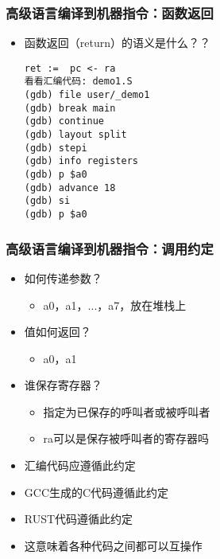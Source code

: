 \begin{frame}[fragile]
	\frametitle{高级语言编译到机器指令：\small{函数返回}}
	
	\begin{itemize}
		
		\item 函数返回（return）的语义是什么？？	
		
		
\begin{block}{}
\begin{verbatim}
ret :=  pc <- ra
看看汇编代码: demo1.S
(gdb) file user/_demo1
(gdb) break main
(gdb) continue
(gdb) layout split
(gdb) stepi
(gdb) info registers
(gdb) p $a0
(gdb) advance 18
(gdb) si
(gdb) p $a0
\end{verbatim}
\end{block}  

	\end{itemize}
	
\end{frame}



\begin{frame}
	\frametitle{高级语言编译到机器指令：\small{调用约定}}
	
 \begin{itemize}
	\item 如何传递参数？
	\begin{itemize}
	 	\item a0，a1，...，a7，放在堆栈上
	\end{itemize}
	\item 值如何返回？
	\begin{itemize}
		\item a0，a1
	\end{itemize}	
	\item 谁保存寄存器？
	\begin{itemize}
		\item 指定为已保存的呼叫者或被呼叫者
	    \item ra可以是保存被呼叫者的寄存器吗
    \end{itemize}   
	
	\item 汇编代码应遵循此约定
	\item GCC生成的C代码遵循此约定
	\item RUST代码遵循此约定
	\item 这意味着各种代码之间都可以互操作

\end{itemize} 
	
\end{frame}

